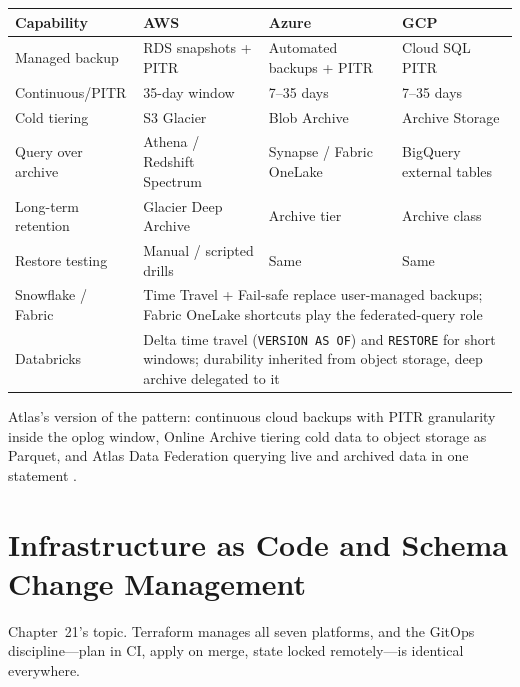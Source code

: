 \begin{center}
\footnotesize
\begin{tabular}{@{}p{2.9cm}p{3.0cm}p{3.0cm}p{3.0cm}@{}}
\toprule
\textbf{Capability} & \textbf{AWS} & \textbf{Azure} & \textbf{GCP} \\
\midrule
Managed backup & RDS snapshots + PITR & Automated backups + PITR & Cloud SQL PITR \\
Continuous/PITR & 35-day window & 7--35 days & 7--35 days \\
Cold tiering & S3 Glacier & Blob Archive & Archive Storage \\
Query over archive & Athena / Redshift Spectrum & Synapse / Fabric OneLake & BigQuery external tables \\
Long-term retention & Glacier Deep Archive & Archive tier & Archive class \\
Restore testing & Manual / scripted drills & Same & Same \\
\addlinespace
Snowflake / Fabric & \multicolumn{3}{l}{Time Travel + Fail-safe replace user-managed backups; Fabric OneLake shortcuts play the federated-query role} \\
Databricks & \multicolumn{3}{l}{Delta time travel (\texttt{VERSION AS OF}) and \texttt{RESTORE} for short windows; durability inherited from object storage, deep archive delegated to it} \\
\bottomrule
\end{tabular}
\end{center}

\noindent Atlas's version of the pattern: continuous cloud backups with PITR granularity inside
the oplog window, Online Archive tiering cold data to object storage as Parquet, and Atlas Data
Federation querying live and archived data in one statement
\cite{mongodbAtlasBackupDocs,mongodbOnlineArchiveDocs,mongodbDataFederationDocs}.

\section{Infrastructure as Code and Schema Change Management}
%
Chapter~21's topic. Terraform manages all seven platforms, and the GitOps discipline---plan in
CI, apply on merge, state locked remotely---is identical everywhere.

